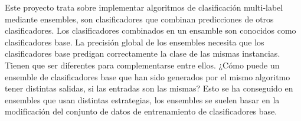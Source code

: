 
Este proyecto trata sobre implementar algoritmos de clasificación multi-label mediante ensembles, son clasificadores que combinan predicciones de otros clasificadores. Los clasificadores combinados en un ensamble son conocidos como clasificadores base.
La precisión global de los ensembles necesita que los clasificadores base predigan correctamente la clase de las mismas instancias. Tienen que ser diferentes para complementarse entre ellos. ¿Cómo puede un ensemble de clasificadores base que han sido generados por el mismo algoritmo tener distintas salidas, si las entradas son las mismas? Esto se ha conseguido en ensembles que usan distintas estrategias, los ensembles se suelen basar en la modificación del conjunto de datos de entrenamiento de clasificadores base. 



